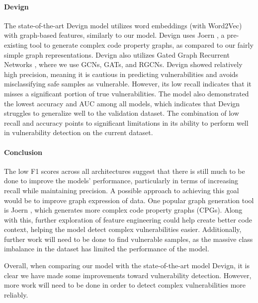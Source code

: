 \documentclass{article}
\begin{document}
\paragraph{Devign}
The state-of-the-art Devign model utilizes word embeddings (with Word2Vec) with graph-based features, similarly to our model. Devign uses Joern \cite{joern}, a pre-existing tool to generate complex code property graphs, as compared to our fairly simple graph representations. Devign also utilizes Gated Graph Recurrent Networks \cite{ggrn}, where we use GCNs, GATs, and RGCNs. Devign showed relatively high precision, meaning it is cautious in predicting vulnerabilities and avoids misclassifying safe samples as vulnerable. However, its low recall indicates that it misses a significant portion of true vulnerabilities. The model also demonstrated the lowest accuracy and AUC among all models, which indicates that Devign struggles to generalize well to the validation dataset. The combination of low recall and accuracy points to significant limitations in its ability to perform well in vulnerability detection on the current dataset.

\paragraph{Conclusion}
The low F1 scores across all architectures suggest that there is still much to be done to improve the models' performance, particularly in terms of increasing recall while maintaining precision. A possible approach to achieving this goal would be to improve graph expression of data. One popular graph generation tool is Joern \cite{joern}, which generates more complex code property graphs (CPGs). Along with this, further exploration of feature engineering could help create better code context, helping the model detect complex vulnerabilities easier. Additionally, further work will need to be done to find vulnerable samples, as the massive class imbalance in the dataset has limited the performance of the model.

Overall, when comparing our model with the state-of-the-art model Devign, it is clear we have made some improvements toward vulnerability detection. However, more work will need to be done in order to detect complex vulnerabilities more reliably.

\clearpage


\end{document}
